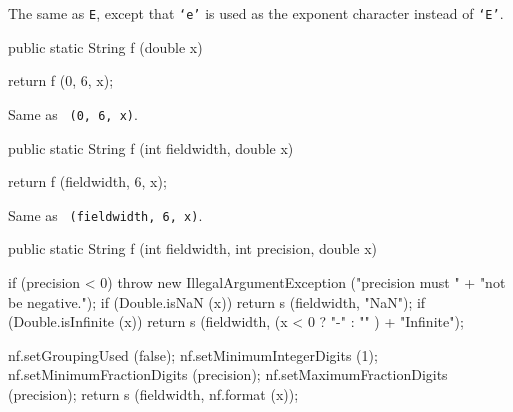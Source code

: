 \begin{tabb} The same as \texttt{E}, except that \texttt{`e'} is used as the exponent
character instead of \texttt{`E'}.
\end{tabb}
\begin{htmlonly}
\end{htmlonly}
\begin{code}

   public static String f (double x)\begin{hide} {
        return f (0, 6, x);
   }\end{hide}
\end{code}
\begin{tabb}   Same as ~\texttt{(0, 6, x)}.
\end{tabb}
\begin{htmlonly}
\end{htmlonly}
\begin{code}

   public static String f (int fieldwidth, double x)\begin{hide} {
        return f (fieldwidth, 6, x);
   }\end{hide}
\end{code}
\begin{tabb}   Same as ~\texttt{(fieldwidth, 6, x)}.
\end{tabb}
\begin{htmlonly}
\end{htmlonly}
\begin{code}

   public static String f (int fieldwidth, int precision, double x)\begin{hide} {
        if (precision < 0)
            throw new IllegalArgumentException ("precision must " +
                                               "not be negative.");
        if (Double.isNaN (x))
           return s (fieldwidth, "NaN");
        if (Double.isInfinite (x))
           return s (fieldwidth, (x < 0 ? "-" : "" ) + "Infinite");

        nf.setGroupingUsed (false);
        nf.setMinimumIntegerDigits (1);
        nf.setMinimumFractionDigits (precision);
        nf.setMaximumFractionDigits (precision);
        return s (fieldwidth, nf.format (x));
   }\end{hide}
\end{code}
